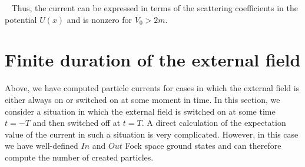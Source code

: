 \documentclass[12pt]{article}
\numberwithin{equation}{section}
\begin{document}
\
Thus, the current can be expressed in terms of the scattering coefficients in the potential $U(x)$ and is nonzero for $V_0> 2m$.





\section{Finite duration of the external field}\label{sec:Finite action of the external electric field} 
Above, we have computed particle currents for cases in which the external field is either always on or switched on at some moment in time. In this section, we consider a situation in which the external field is switched on at some time $t = -T$ and then switched off at $t = T$. A direct calculation of the expectation value of the current in such a situation is very complicated. However, in this case we have well-defined $In$ and $Out$ Fock space ground states and can therefore compute the number of created particles.
\end{document}
